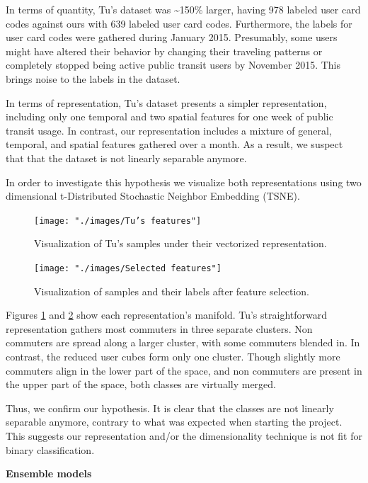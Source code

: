 \documentclass{article}
\begin{document}
In terms of quantity, Tu's dataset was \textasciitilde 150\% larger, having 978 labeled user card codes against ours with 639 labeled user card codes. Furthermore, the labels for user card codes were gathered during January 2015. Presumably, some users might have altered their behavior by changing their traveling patterns or completely stopped being active public transit users by November 2015. This brings noise to the labels in the dataset.

In terms of representation, Tu's dataset presents a simpler representation, including only one temporal and two spatial features for one week of public transit usage. In contrast, our representation includes a mixture of general, temporal, and spatial features gathered over a month. As a result, we suspect that that the dataset is not linearly separable anymore. 

In order to investigate this hypothesis we visualize both representations using two dimensional t-Distributed Stochastic Neighbor Embedding (TSNE). 
  
\begin{figure}[H]
  \centering
  \texttt{[image: "./images/Tu's features"]}
  \caption{Visualization of Tu's samples under their vectorized representation.}
  \label{fig:classification/tu}
\end{figure} 

\begin{figure}[H]
  \centering
  \texttt{[image: "./images/Selected features"]}
  \caption{Visualization of samples and their labels after feature selection.}
  \label{fig:classification/tsne}
\end{figure}  

Figures \ref{fig:classification/tu} and \ref{fig:classification/tsne} show each representation's manifold. Tu's straightforward representation gathers most commuters in three separate clusters. Non commuters are spread along a larger cluster, with some commuters blended in.  In contrast, the reduced user cubes form only one cluster. Though slightly more commuters align in the lower part of the space, and non commuters are present in the upper part of the space, both classes are virtually merged. 

Thus, we confirm our hypothesis. It is clear that the classes are not linearly separable anymore, contrary to what was expected when starting the project. This suggests our representation and/or the dimensionality technique is not fit for binary classification.

\textbf{Ensemble models}
\end{document}
